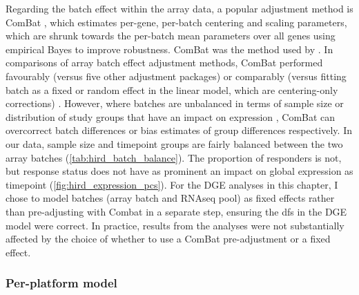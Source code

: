 Regarding the batch effect within the array data, a popular adjustment method is ComBat \autocite{johnson2007AdjustingBatchEffects}, which estimates per-gene, per-batch centering and scaling parameters, which are shrunk towards the per-batch mean parameters over all genes using empirical Bayes to improve robustness.
ComBat was the method used by \textcite{sobolev2016AdjuvantedInfluenzaH1N1Vaccination}.
In comparisons of array batch effect adjustment methods, ComBat performed favourably (versus five other adjustment packages) \autocite{chen2011RemovingBatchEffects} or comparably (versus fitting batch as a fixed or random effect in the linear model, which are centering-only corrections) \autocite{espin-perez2018ComparisonStatisticalMethods}.
However, where batches are unbalanced in terms of sample size \autocite{zhang2018AlternativeEmpiricalBayes} or distribution of study groups that have an impact on expression \autocite{nygaard2015MethodsThatRemove}, ComBat can overcorrect batch differences or bias estimates of group differences respectively.
In our data, sample size and timepoint groups are fairly balanced between the two array batches (\cref{tab:hird_batch_balance}).
The proportion of responders is not, but response status does not have as prominent an impact on global expression as timepoint (\cref{fig:hird_expression_pcs}).
For the \gls{DGE} analyses in this chapter, I chose to model batches (array batch and \gls{RNAseq} pool) as fixed effects rather than pre-adjusting with Combat in a separate step, ensuring the \glspl{df} in the \gls{DGE} model were correct.
In practice, results from the analyses were not substantially affected by the choice of whether to use a ComBat pre-adjustment or a fixed effect.
%



\subsubsection{Per-platform  model}

